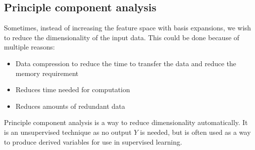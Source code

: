 \documentclass[CS5104-Notes.tex]{subfiles}
\begin{document}
\subsection{Principle component analysis}
Sometimes, instead of increasing the feature space with basis expansions, we wish to reduce the dimensionality of the input data. This could be done because of multiple reasons:
\begin{itemize}
\item Data compression to reduce the time to transfer the data and reduce the memory requirement
\item Reduces time needed for computation
\item Reduces amounts of redundant data
\end{itemize}
Principle component analysis is a way to reduce dimensionality automatically. It is an unsupervised technique as no output $Y$ is needed, but is often used as a way to produce derived variables for use in supervised learning.
\end{document}
